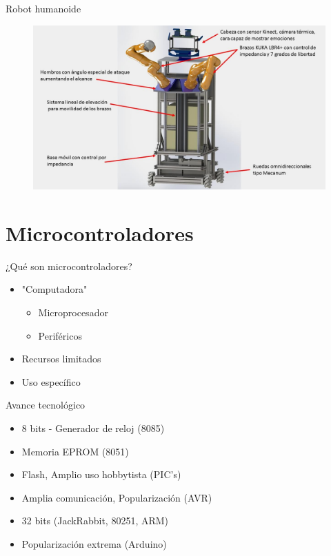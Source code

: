 \documentclass[10pt]{beamer}
\begin{document}
\begin{frame}{Robot humanoide}
	\begin{center}
		\begin{figure}
			\includegraphics[width=1\textwidth]{img/robot-info.jpg}
		\end{figure}
	\end{center}
\end{frame}

\section{Microcontroladores}

\begin{frame}{¿Qué son microcontroladores?}
	\begin{itemize}
		\item "Computadora"
        	\begin{itemize}
        		\item Microprocesador
                \item Periféricos
        	\end{itemize}
        \item Recursos limitados
        \item Uso específico
	\end{itemize}
\end{frame}

\begin{frame}{Avance tecnológico}
	\begin{itemize}[<+- | alert@+>]
		\item 8 bits - Generador de reloj (8085)
        \item Memoria EPROM (8051)
        \item Flash, Amplio uso hobbytista (PIC's)
        \item Amplia comunicación, Popularización (AVR)
        \item 32 bits (JackRabbit, 80251, ARM)
        \item Popularización extrema (Arduino)
	\end{itemize}
\end{frame}
\end{document}
